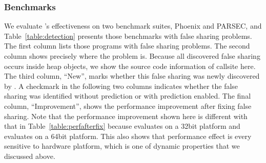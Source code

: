 \subsubsection{Benchmarks}
\label{sec:benchmarks}

\begin{table}[!t]
{\centering
{}
\caption{False sharing problems in the Phoenix and PARSEC benchmark suites. \label{table:detection}}
}
\end{table}

We evaluate \Predator{}'s effectiveness on two benchmark suites, Phoenix and PARSEC, and Table~\ref{table:detection} presents those benchmarks with false sharing problems. 
The first column lists those programs with false sharing problems.  The second column shows precisely where the problem is. Because all discovered false sharing occurs inside heap objects, we show the source code information of callsite here.  The third column, ``New'', marks whether this false sharing was newly discovered by \Predator{}.  A checkmark in the  following two columns indicates whether the false sharing was identified without prediction or with prediction enabled.  The final column, ``Improvement'', shows the performance improvement after fixing false sharing. Note that the performance improvement shown here is different with that in Table~\ref{table:perfafterfix} because \SheriffDetect{} evaluates on a 32bit platform and \Predator{} evaluates on a 64bit platform. This also shows that performance effect is every sensitive to hardware platform, which is one of dynamic properties that we discussed above. 

